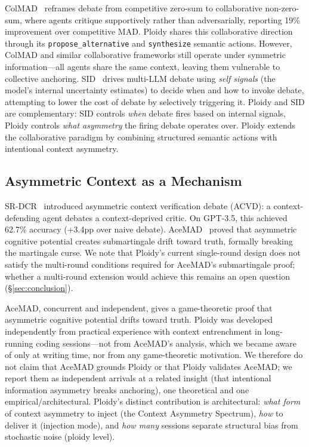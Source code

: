 \documentclass[11pt]{article}
\begin{document}
ColMAD~\citep{chen2025colmad} reframes debate from competitive zero-sum to collaborative non-zero-sum, where agents critique supportively rather than adversarially, reporting 19\% improvement over competitive MAD. Ploidy shares this collaborative direction through its \texttt{propose\_alternative} and \texttt{synthesize} semantic actions. However, ColMAD and similar collaborative frameworks still operate under symmetric information---all agents share the same context, leaving them vulnerable to collective anchoring. SID~\citep{chen2025sid} drives multi-LLM debate using \emph{self signals} (the model's internal uncertainty estimates) to decide when and how to invoke debate, attempting to lower the cost of debate by selectively triggering it. Ploidy and SID are complementary: SID controls \emph{when} debate fires based on internal signals, Ploidy controls \emph{what asymmetry} the firing debate operates over. Ploidy extends the collaborative paradigm by combining structured semantic actions with intentional context asymmetry.

\subsection{Asymmetric Context as a Mechanism}
\label{sec:asymmetric}

SR-DCR~\citep{srdcr2025} introduced asymmetric context verification debate (ACVD): a context-defending agent debates a context-deprived critic. On GPT-3.5, this achieved 62.7\% accuracy (+3.4pp over naive debate). AceMAD~\citep{liu2026acemad} proved that asymmetric cognitive potential creates submartingale drift toward truth, formally breaking the martingale curse. We note that Ploidy's current single-round design does not satisfy the multi-round conditions required for AceMAD's submartingale proof; whether a multi-round extension would achieve this remains an open question (\S\ref{sec:conclusion}).

AceMAD, concurrent and independent, gives a game-theoretic proof that asymmetric cognitive potential drifts toward truth. Ploidy was developed independently from practical experience with context entrenchment in long-running coding sessions---not from AceMAD's analysis, which we became aware of only at writing time, nor from any game-theoretic motivation. We therefore do not claim that AceMAD grounds Ploidy or that Ploidy validates AceMAD; we report them as independent arrivals at a related insight (that intentional information asymmetry breaks anchoring), one theoretical and one empirical/architectural. Ploidy's distinct contribution is architectural: \emph{what form} of context asymmetry to inject (the Context Asymmetry Spectrum), \emph{how} to deliver it (injection mode), and \emph{how many} sessions separate structural bias from stochastic noise (ploidy level).
\end{document}
